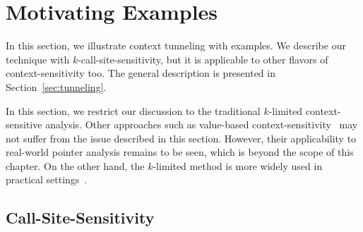 
\section{Motivating Examples}
\label{sec:overview}

In this section, we illustrate context tunneling with examples.
We describe our technique with $k$-call-site-sensitivity, but it is applicable to other flavors of
context-sensitivity too. The general description
is presented in Section~\ref{sec:tunneling}.


In this section, we restrict our discussion to the
traditional $k$-limited context-sensitive analysis. %
Other approaches
such as value-based context-sensitivity~\cite{Khedker2008,PadhyeK13}
may not suffer from the issue described in this section.
However, their applicability to real-world pointer analysis remains to
be seen, which is beyond the scope of this chapter. On the other hand,
the $k$-limited method is more widely used in practical settings~\cite{Bravenboer2009,Smaragdakis2011,KastrinisS13a,Smaragdakis2014,JeJeChOh17}.






\subsection{Call-Site-Sensitivity}

